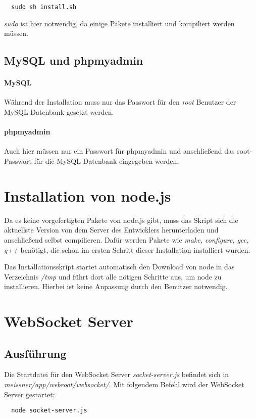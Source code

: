 \begin{lstlisting}
  sudo sh install.sh
\end{lstlisting}

\emph{sudo} ist hier notwendig, da einige Pakete installiert und kompiliert werden müssen.

\subsection{MySQL und phpmyadmin}
\paragraph{MySQL}
Während der Installation muss nur das Passwort für den \emph{root} Benutzer der MySQL Datenbank gesetzt werden.

\paragraph{phpmyadmin}
Auch hier müssen nur ein Passwort für phpmyadmin und anschließend das root-Passwort für die MySQL Datenbank eingegeben werden.



\section{Installation von node.js}
Da es keine vorgefertigten Pakete von node.js gibt, muss das Skript sich die aktuellste Version von dem Server des Entwicklers herunterladen und anschließend selbst compilieren. Dafür werden Pakete wie \emph{make, configure, gcc, g++} benötigt, die schon im ersten Schritt dieser Installation installiert wurden.\par

Das Installationsskript startet automatisch den Download von node in das Verzeichnis \emph{/tmp} und führt dort alle nötigen Schritte aus, um node zu installieren. Hierbei ist keine Anpassung durch den Benutzer notwendig.


\section{WebSocket Server}
\subsection{Ausführung}
Die Startdatei für den WebSocket Server \emph{socket-server.js} befindet sich in \emph{meissner/app/webroot/websocket/}. Mit folgendem Befehl wird der WebSocket Server gestartet:\\
\begin{lstlisting}
  node socket-server.js
\end{lstlisting}

